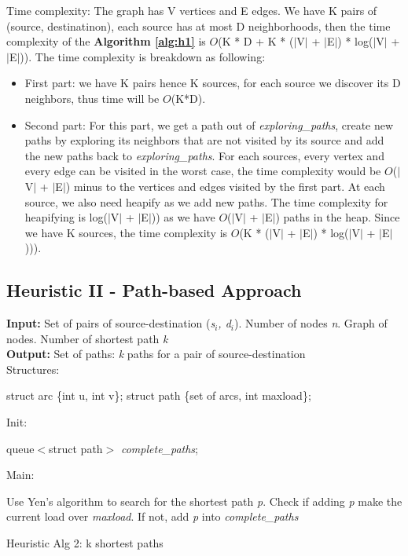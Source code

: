 Time complexity: The graph has V vertices and E edges. We have K pairs of (source, destinatinon), each source has at most D neighborhoods, then the time complexity of the \textbf{Algorithm \ref{alg:h1}} is $O$(K * D + K * ($|$V$|$ + $|$E$|$) * log($|$V$|$ + $|$E$|$)). The time complexity is breakdown as following:
\begin{itemize}
\item First part: we have K pairs hence K sources, for each source we discover its D neighbors, thus time will be $O$(K*D).
\item Second part: For this part, we get a path out of \textit{exploring\_paths}, create new paths by exploring its neighbors that are not visited by its source and add the new paths back to \textit{exploring\_paths}. For each sources, every vertex and every edge can be visited in the worst case, the time complexity would be $O$($|$V$|$ + $|$E$|$) minus to the vertices and edges visited by the first part. At each source, we also need heapify as we add new paths. The time complexity for heapifying is log($|$V$|$ + $|$E$|$)) as we have $O$($|$V$|$ + $|$E$|$) paths in the heap. Since we have K sources, the time complexity is $O$(K * ($|$V$|$ + $|$E$|$) * log($|$V$|$ + $|$E$|$))).
\end{itemize}

\subsection{Heuristic II - Path-based Approach}

\begin{algorithm}[!htp]
\textbf{Input:} Set of pairs of source-destination (\textit{s$_i$, d$_i$}). Number of nodes \textit{n}. Graph of nodes. Number of shortest path \textit{k}\\
\textbf{Output:} Set of paths: \textit{k} paths for a pair of source-destination\\
Structures:
    \begin{algorithmic}
        \State struct arc \{int u, int v\};
        \State struct path \{set of arcs, int maxload\};
    \end{algorithmic}

Init:
    \begin{algorithmic}
        \State queue$<$struct path$>$ \textit{complete\_paths};
    \end{algorithmic}
Main:
\begin{algorithmic}
		\State Use Yen's algorithm to search for the shortest path \textit{p}.
		\State Check if adding \textit{p} make the current load over \textit{maxload}.
		\State If not, add \textit{p} into \textit{complete\_paths}
	    \EndWhile
	\EndFor
    \EndFunction
\end{algorithmic}

\caption{Heuristic Alg 2: k shortest paths}
\label{alg:h2}

\end{algorithm}

